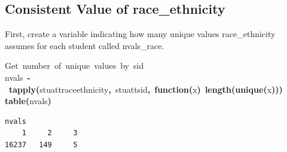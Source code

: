 \documentclass[12pt]{article}
\makeatletter
\newcommand{\hlfunctioncall}[1]{\textcolor[rgb]{0.501960784313725,0,0.329411764705882}{\textbf{#1}}}%
\newcommand{\hlkeyword}[1]{\textcolor[rgb]{0,0,0}{\textbf{#1}}}%
\newcommand{\hlcomment}[1]{\textcolor[rgb]{0.180392156862745,0.6,0.341176470588235}{#1}}%
\newcommand{\hlformalargs}[1]{\textcolor[rgb]{0.690196078431373,0.250980392156863,0.0196078431372549}{#1}}%
\newcommand{\hlassignement}[1]{\textcolor[rgb]{0,0,0}{\textbf{#1}}}%
\newcommand{\hlsymbol}[1]{\textcolor[rgb]{0,0,0}{#1}}%
\newcommand{\hlstd}[1]{\textcolor[rgb]{0,0,0}{#1}}%
\newenvironment{kframe}{%
 \def\FrameCommand##1{\hskip\@totalleftmargin \hskip-\fboxsep
 \colorbox{shadecolor}{##1}\hskip-\fboxsep
     \hskip-\linewidth \hskip-\@totalleftmargin \hskip\columnwidth}%
 \MakeFramed {\advance\hsize-\width
   \@totalleftmargin\z@ \linewidth\hsize
   \@setminipage}}%
 {\par\unskip\endMakeFramed}
\newenvironment{knitrout}{}{} %
\renewenvironment{knitrout}{\begin{footnotesize}}{\end{footnotesize}}
\makeatother
\begin{document}
\subsection{Consistent Value of race\_ethnicity}

First, create a variable indicating how many unique values race\_ethnicity assumes for each student called nvals\_race.




\begin{knitrout}
\color{fgcolor}\begin{kframe}
\begin{flushleft}
\ttfamily\noindent
\hlcomment{\usebox{\hlnormalsizeboxhash}{\ }Get{\ }number{\ }of{\ }unique{\ }values{\ }by{\ }sid}\hspace*{\fill}\\
\hlstd{}\hlsymbol{nvals}{\ }\hlassignement{\usebox{\hlnormalsizeboxlessthan}-}{\ }\hlfunctioncall{tapply}\hlkeyword{(}\hlsymbol{stuatt}\hlkeyword{\usebox{\hlnormalsizeboxdollar}}\hlsymbol{race\usebox{\hlnormalsizeboxunderscore}ethnicity}\hlkeyword{,}{\ }\hlsymbol{stuatt}\hlkeyword{\usebox{\hlnormalsizeboxdollar}}\hlsymbol{sid}\hlkeyword{,}{\ }\hlkeyword{function}\hlkeyword{(}\hlformalargs{x}\hlkeyword{)}{\ }\hlfunctioncall{length}\hlkeyword{(}\hlfunctioncall{unique}\hlkeyword{(}\hlsymbol{x}\hlkeyword{)}\hlkeyword{)}\hlkeyword{)}\hspace*{\fill}\\
\hlstd{}\hlfunctioncall{table}\hlkeyword{(}\hlsymbol{nvals}\hlkeyword{)}\mbox{}
\normalfont
\end{flushleft}
\begin{verbatim}
nvals
    1     2     3 
16237   149     5 
\end{verbatim}
\end{kframe}
\end{knitrout}
\end{document}
